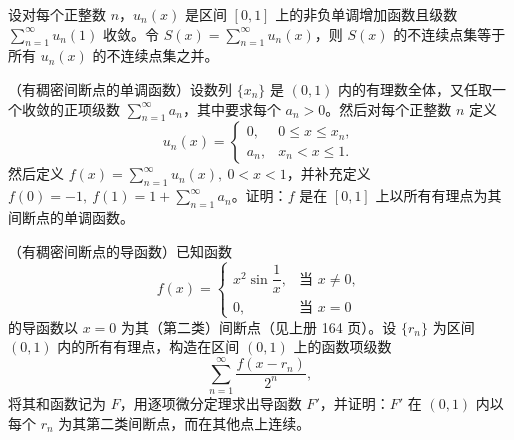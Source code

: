 \begin{xreferenceproblem}[15]
设对每个正整数 $n$，$u_n(x)$ 是区间 $[0,1]$ 上的非负单调增加函数且级数 $\sum_{n=1}^{\infty}u_n(1)$ 收敛。令 $S(x)=\sum_{n=1}^{\infty}u_n(x)$，则 $S(x)$ 的不连续点集等于所有 $u_n(x)$ 的不连续点集之并。
\end{xreferenceproblem}

\begin{xreferenceproblem}[16]
（有稠密间断点的单调函数）设数列 $\{x_n\}$ 是 $(0,1)$ 内的有理数全体，又任取一个收敛的正项级数 $\sum_{n=1}^{\infty}a_n$，其中要求每个 $a_n>0$。然后对每个正整数 $n$ 定义
\[
  u_n(x)=
  \begin{cases}
    0,&0\leqslant x\leqslant x_n,\\
    a_n,&x_n<x\leqslant1.
  \end{cases}
\]
然后定义 $f(x)=\sum_{n=1}^{\infty}u_n(x),\ 0<x<1$，并补充定义 $f(0)=-1,\ f(1)=1+\sum_{n=1}^{\infty}a_n$。证明：$f$ 是在 $[0,1]$ 上以所有有理点为其间断点的单调函数。
\end{xreferenceproblem}

\begin{xreferenceproblem}[17]
（有稠密间断点的导函数）已知函数
\[
  f(x)=
  \begin{cases}
    x^2\sin\dfrac1x,&\text{当 }x\ne0,\\
    0,&\text{当 }x=0
  \end{cases}
\]
的导函数以 $x=0$ 为其（第二类）间断点（见上册 164 页）。设 $\{r_n\}$ 为区间 $(0,1)$ 内的所有有理点，构造在区间 $(0,1)$ 上的函数项级数
\[
  \sum_{n=1}^{\infty}\frac{f(x-r_n)}{2^n},
\]
将其和函数记为 $F$，用逐项微分定理求出导函数 $F'$，并证明：$F'$ 在 $(0,1)$ 内以每个 $r_n$ 为其第二类间断点，而在其他点上连续。
\end{xreferenceproblem}
